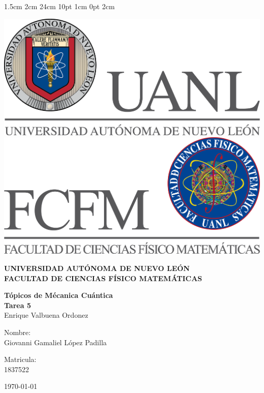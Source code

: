 \documentclass[12pt,letterpaper]{report}
\begin{document}
\setmargins{2.5cm}      
{1.5cm}                     
{2cm}  
{24cm}                    
{10pt}                          
{1cm}                          
{0pt}                             
{2cm}
\begin{titlepage}
\begin{center}
\includegraphics[scale=0.40]{../../Logos/uanl.png} 
\hspace{2.5cm}
\includegraphics[scale=0.40]{../../Logos/fcfm.png}
\end{center}
\vspace{2cm}
\begin{center}
\textbf{
UNIVERSIDAD AUTÓNOMA DE NUEVO LEÓN\\
FACULTAD DE CIENCIAS
    FÍSICO MATEMÁTICAS}\\
\vspace*{2cm}
\begin{large}
\vspace{1cm}
\large{\textbf{Tópicos de Mécanica Cuántica}}\\
\textbf{Tarea 5}\\
Enrique Valbuena Ordonez\\
\end{large}
\vspace{3.5cm}
\begin{minipage}{0.6\linewidth}
\vspace{0.5cm}
\changefontsizes{14pt}
Nombre:\\
Giovanni Gamaliel López Padilla\\
\end{minipage}
\begin{minipage}{0.2\linewidth}
\changefontsizes{14pt}
Matricula:\\
1837522
\end{minipage}
\end{center}
\vspace{4cm}
\begin{flushright}
\today
\end{flushright}
\end{titlepage}
\end{document}

